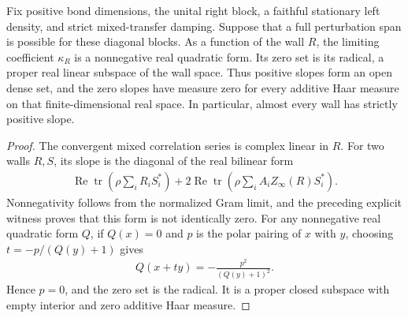 \begin{lemma}
    \label{thm:uncle_wall_gram_generic_positive}
    \leanok
    Fix positive bond dimensions, the unital right block, a faithful
    stationary left density, and strict mixed-transfer damping. Suppose
    that a full perturbation span is possible for these diagonal blocks.
    As a function of the wall $R$, the limiting coefficient
    $\kappa_R$ is a nonnegative real quadratic form. Its zero set is its
    radical, a proper real linear subspace of the wall space. Thus positive
    slopes form an open dense set, and the zero slopes have measure zero
    for every additive Haar measure on that finite-dimensional real space.
    In particular, almost every wall has strictly positive slope.
\end{lemma}
\begin{proof}
    \leanok
    The convergent mixed correlation series is complex linear in $R$.
    For two walls $R,S$, its slope is the diagonal of the real
    bilinear form
    \begin{align}
        \operatorname{Re}\operatorname{tr}\!\left(\rho\sum_iR_iS_i^*\right)
        +2\operatorname{Re}\operatorname{tr}\!\left(\rho\sum_iA_iZ_\infty(R)S_i^*\right).
    \end{align}
    Nonnegativity follows from the normalized Gram limit, and the
    preceding explicit witness proves that this form is not identically
    zero. For any nonnegative real quadratic form $Q$, if $Q(x)=0$ and
    $p$ is the polar pairing of $x$ with $y$, choosing
    $t=-p/(Q(y)+1)$ gives
    \begin{align}
        Q(x+ty)=-\frac{p^2}{(Q(y)+1)^2}.
    \end{align}
    Hence $p=0$, and the zero set is the radical. It is a proper closed
    subspace with empty interior and zero additive Haar measure.
\end{proof}

